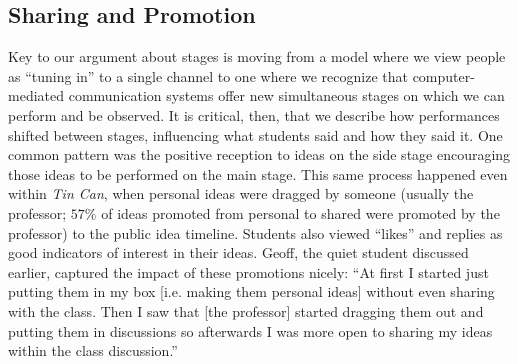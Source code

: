 





\subsection{Sharing and Promotion}

Key to our argument about stages is moving from a model where we view people as ``tuning in'' to a single channel to one where we recognize that computer-mediated communication systems offer new simultaneous stages on which we can perform and be observed. It is critical, then, that we describe how performances shifted between stages, influencing what students said and how they said it. One common pattern was the positive reception to ideas on the side stage encouraging those ideas to be performed on the main stage. This same process happened even within \emph{Tin Can}, when personal ideas were dragged by someone (usually the professor; $57\%$ of ideas promoted from personal to shared were promoted by the professor) to the public idea timeline. Students also viewed ``likes'' and replies as good indicators of interest in their ideas. Geoff, the quiet student discussed earlier, captured the impact of these promotions nicely: ``At first I started just putting them in my box [i.e. making them personal ideas] without even sharing with the class. Then I saw that [the professor] started dragging them out and putting them in discussions so afterwards I was more open to sharing my ideas within the class discussion.''

